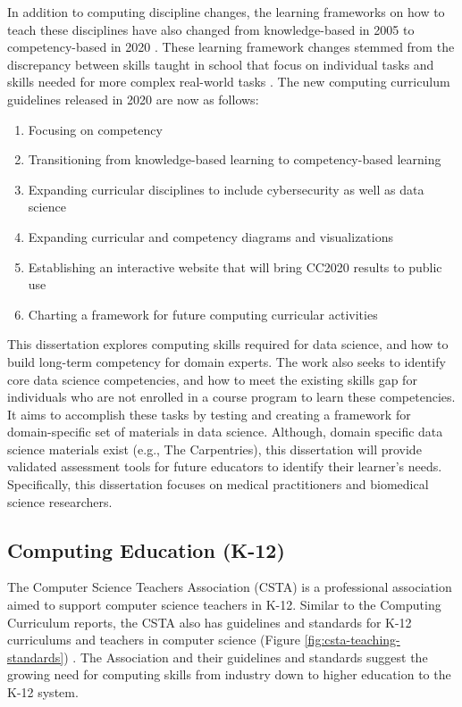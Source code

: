 \documentclass[010-intro.tex]{subfiles}
\begin{document}
    In addition to computing discipline changes,
    the learning frameworks on how to teach these disciplines have also changed
    from knowledge-based in 2005 to competency-based in 2020
    \cite{cc2020}.
    These learning framework changes stemmed from the discrepancy between
    skills taught in school that focus on individual tasks and skills needed for more complex real-world tasks
    \cite{cc2020}.
    The new computing curriculum guidelines released in 2020 are now as follows:

    \begin{enumerate}
        \item Focusing on competency
        \item Transitioning from knowledge-based learning to competency-based learning
        \item Expanding curricular disciplines to include cybersecurity as well as data science
        \item Expanding curricular and competency diagrams and visualizations
        \item Establishing an interactive website that will bring CC2020 results to public use
        \item Charting a framework for future computing curricular activities
    \end{enumerate}

    This dissertation explores computing skills required for data science,
    and how to build long-term competency for domain experts.
    The work also seeks to identify core data science competencies,
    and how to meet the existing skills gap for individuals who are not enrolled
    in a course program to learn these competencies.
    It aims to accomplish these tasks by
    testing and creating a framework for domain-specific set of materials in data science.
    Although, domain specific data science materials exist (e.g., The Carpentries),
    this dissertation will provide validated assessment tools for future educators to identify their
    learner's needs.
    Specifically, this dissertation focuses on medical practitioners and biomedical science researchers.

\subsection{Computing Education (K-12)}

    The Computer Science Teachers Association (CSTA)
    is a professional association aimed to support computer science teachers in K-12.
    Similar to the Computing Curriculum reports,
    the CSTA also has guidelines and standards for K-12 curriculums and teachers in computer science
    (Figure \ref{fig:csta-teaching-standards})
    \cite{csta2017}.
    The Association and their guidelines and standards suggest the growing need for computing skills from
    industry down to higher education to the K-12 system.
\end{document}
